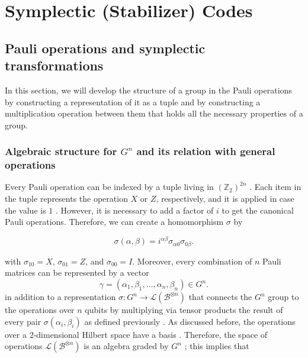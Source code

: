 \chapter{Symplectic (Stabilizer) Codes}

\section{Pauli operations and symplectic transformations}

In this section, we will develop the structure of a group in the Pauli operations by constructing a representation of it as a tuple and by constructing a multiplication operation between them that holds all the necessary properties of a group.

\subsection{Algebraic structure for $G^n$ and its relation with general operations}

Every Pauli operation can be indexed by a tuple living in $\left(\mathbb{Z}_2\right)^{2n}$ \citep{Kitaev2002}. Each item in the tuple represents the operation $X$ or $Z$, respectively, and it is applied in case the value is $1$ \citep{Kitaev2002}. However, it is necessary to add a factor of $i$ to get the canonical Pauli operations. Therefore, we can create a homomorphism $\sigma$ by

\begin{equation}
  \sigma(\alpha, \beta) = i^{\alpha \beta}\sigma_{\alpha 0}\sigma_{0 \beta}
.\end{equation}

with $\sigma_{10} = X$, $\sigma_{01} = Z$, and $\sigma_{00} = I$. Moreover, every combination of $n$ Pauli matrices can be represented by a vector
\begin{equation}
\gamma = \left(\alpha_1, \beta_1, \ldots, \alpha_n, \beta_n \right) \in G^n
.\end{equation}
in addition to a representation $\sigma : G^n \to \mathcal{L}(\mathcal{B}^{\otimes n})$ that connects the $G^n$ group to the operations over $n$ qubits by multiplying via tensor products the result of every pair $\sigma(\alpha_i, \beta_i)$ as defined previously \citep{Kitaev2002}. As discussed before, the operations over a 2-dimensional Hilbert space have a basis \label{tab:representations_of_pauli_operations}. Therefore, the space of operations $\mathcal{L}(\mathcal{B}^{\otimes n})$ is an algebra graded by $G^n$ \citep{Kitaev2002}; this implies that 

